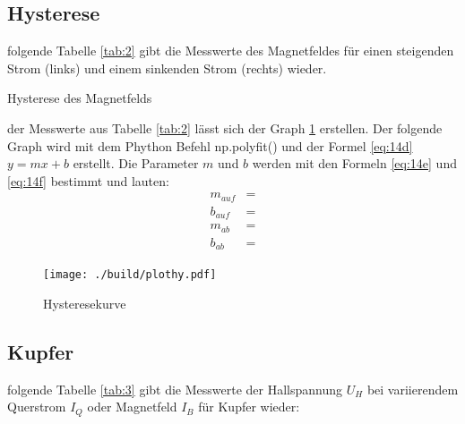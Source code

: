 \subsection{Hysterese} \label{sec:5.2}

\justifying folgende Tabelle \ref{tab:2} gibt die Messwerte des Magnetfeldes für einen steigenden Strom (links) und einem 
sinkenden Strom (rechts) wieder. 

\begin{table}[H]
    \centering
    
    \caption{Hysterese des Magnetfelds}
    \label{tab:2}
\end{table}

\justifying der Messwerte aus Tabelle \ref{tab:2} lässt sich der Graph \ref{fig:2} erstellen. Der folgende Graph wird 
mit dem Phython Befehl np.polyfit() \cite{numpy} und der Formel \eqref{eq:14d} $y = mx + b$ erstellt. Die Parameter $m$ und $b$ werden mit 
den Formeln \eqref{eq:14e} und \eqref{eq:14f} bestimmt und lauten:
\begin{subequations}
\begin{align}
    m_{auf} &= \text{} \label{eq:16a}\\
    b_{auf} &= \text{} \label{eq:16b}\\
    m_{ab}  &= \text{}  \label{eq:16c}\\
    b_{ab}  &= \text{}  \label{eq:16d}
\end{align}
\end{subequations}

\begin{figure}[H]
\centering
\texttt{[image: ./build/plothy.pdf]}
\caption{Hysteresekurve}
\label{fig:2}
\end{figure}

\subsection{Kupfer} \label{sec:5.3}

\justifying folgende Tabelle \ref{tab:3} gibt die Messwerte der Hallspannung $U_H$ bei variierendem Querstrom $I_Q$ oder Magnetfeld
$I_B$ für Kupfer wieder:

